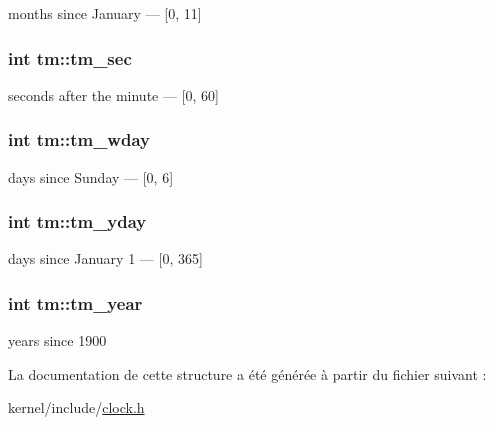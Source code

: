 months since \-January — \mbox{[}0, 11\mbox{]} \hypertarget{structtm_a4d098a9a5c03a00b2ee61e10851de81e}{
\subsubsection[{tm\-\_\-sec}]{\setlength{\rightskip}{0pt plus 5cm}int {\bf tm\-::tm\-\_\-sec}}}\label{structtm_a4d098a9a5c03a00b2ee61e10851de81e}
seconds after the minute — \mbox{[}0, 60\mbox{]} \hypertarget{structtm_afe81a8c46f1c693c43f259b288859f4f}{
\subsubsection[{tm\-\_\-wday}]{\setlength{\rightskip}{0pt plus 5cm}int {\bf tm\-::tm\-\_\-wday}}}\label{structtm_afe81a8c46f1c693c43f259b288859f4f}
days since \-Sunday — \mbox{[}0, 6\mbox{]} \hypertarget{structtm_a93a0ba77cc23796df84405dcbcc57eb1}{
\subsubsection[{tm\-\_\-yday}]{\setlength{\rightskip}{0pt plus 5cm}int {\bf tm\-::tm\-\_\-yday}}}\label{structtm_a93a0ba77cc23796df84405dcbcc57eb1}
days since \-January 1 — \mbox{[}0, 365\mbox{]} \hypertarget{structtm_a33adf78fd6476b2120ce3b9c4a852053}{
\subsubsection[{tm\-\_\-year}]{\setlength{\rightskip}{0pt plus 5cm}int {\bf tm\-::tm\-\_\-year}}}\label{structtm_a33adf78fd6476b2120ce3b9c4a852053}
years since 1900 

\-La documentation de cette structure a été générée à partir du fichier suivant \-:\begin{DoxyCompactItemize}
\item 
kernel/include/\hyperlink{clock_8h}{clock.\-h}\end{DoxyCompactItemize}
